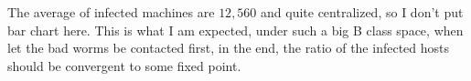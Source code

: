 \documentclass[10pt]{article}
\newcommand{\Section}[1]{
\noindent
\hrulefill
\vspace{-0.15in}
\section{#1}
}
\newcommand{\Questions}[1]{
\subsection*{Questions {\rm \normalsize (\textsf{\textit{#1 points}})}}
}
\begin{document}
The average of infected machines are $12,560$ and quite centralized, so I don't put bar chart here. This is what I am expected, under such a big B class space, when let the bad worms be contacted first, in the end, the ratio of the infected hosts should be convergent to some fixed point. 


%













\end{document}
